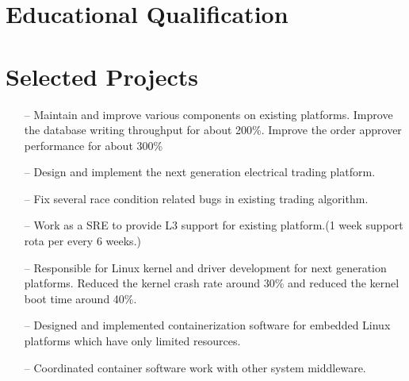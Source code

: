 \documentclass[10pt,a4paper,roman]{moderncv}        %
\begin{document}
\section{Educational Qualification}

\section{Selected Projects}

\begin{itemize}
  \item[--]{Maintain and improve various components on existing platforms. Improve the database writing throughput for about
  200\%. Improve the order approver performance for about 300\%  }
  \item[--]{Design and implement the next generation electrical trading platform.}
  \item[--]{Fix several race condition related bugs in existing trading algorithm.}
  \item[--]{Work as a SRE to provide L3 support for existing platform.(1 week
    support rota per every 6 weeks.)}
\end{itemize}

\begin{itemize}
  \item[--]{Responsible for Linux kernel and driver development for next
    generation platforms. Reduced the kernel crash rate around 30\% and reduced the kernel boot time around 40\%.}
  \item[--]{Designed and implemented containerization software for embedded Linux
    platforms which have only limited resources.}
  \item[--]{Coordinated container software work with other system middleware.}
\end{itemize}
\end{document}
